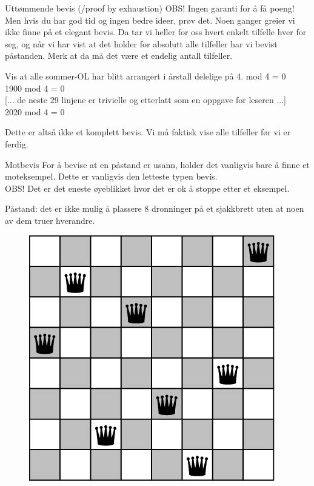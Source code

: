 \begin{frame}{Uttømmende bevis (/proof by exhaustion)}
    OBS! Ingen garanti for å få poeng! Men hvis du har god tid og ingen bedre ideer, prøv det. Noen ganger greier vi ikke finne på et elegant bevis. Da tar vi heller for oss hvert enkelt tilfelle hver for seg, og når vi har vist at det holder for absolutt alle tilfeller har vi bevist påstanden. Merk at da må det være et endelig antall tilfeller.
    \pause
    \begin{block}{Vis at alle sommer-OL har blitt arrangert i årstall delelige på 4.}
         mod 4 = 0 \checkmark \\
        1900 mod 4 = 0 \checkmark \\
        {[... de neste 29 linjene er trivielle og etterlatt som en oppgave for leseren ...]}\\
        2020 mod 4 = 0 \checkmark
    \end{block}
    \pause
    Dette er altså ikke et komplett bevis. Vi må faktisk vise alle tilfeller før vi er ferdig.
\end{frame}

\begin{frame}{Motbevis}
    For å bevise at en påstand er usann, holder det vanligvis bare å finne et moteksempel. Dette er vanligvis den letteste typen bevis.\\
    OBS! Det er det eneste øyeblikket hvor det er ok å stoppe etter et eksempel.
    \pause
    \begin{block}{Påstand: det er ikke mulig å plassere 8 dronninger på et sjakkbrett uten at noen av dem truer hverandre.}
    \pause
    \begin{figure}
        \centering
        \includegraphics[scale=0.20]{images/8 queens.png}
        \label{fig:my_label}
    \end{figure}
    
    \end{block}
\end{frame}

